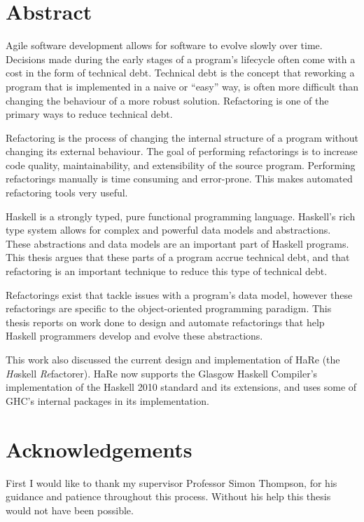 \begin{preface}
\section{Abstract}

Agile software development allows for software to evolve slowly over time. Decisions made during the early stages of a program's lifecycle often come with a cost in the form of technical debt. Technical debt is the concept that reworking a program that is implemented in a naive or ``easy'' way, is often more difficult than changing the behaviour of a more robust solution. Refactoring is one of the primary ways to reduce technical debt.

Refactoring is the process of changing the internal structure of a program without changing its external behaviour. The goal of performing refactorings is to increase code quality, maintainability, and extensibility of the source program. Performing refactorings manually is time consuming and error-prone. This makes automated refactoring tools very useful.

Haskell is a strongly typed, pure functional programming language. Haskell's rich type system allows for complex and powerful data models and abstractions. These abstractions and data models are an important part of Haskell programs. This thesis argues that these parts of a program accrue technical debt, and that refactoring is an important technique to reduce this type of technical debt.

Refactorings exist that tackle issues with a program's data model, however these refactorings are specific to the object-oriented programming paradigm. This thesis reports on work done to design and automate refactorings that help Haskell programmers develop and evolve these abstractions.

This work also discussed the current design and implementation of HaRe (the \textit{Ha}skell \textit{Re}factorer). HaRe now supports the Glasgow Haskell Compiler's implementation of the Haskell 2010 standard and its extensions, and uses some of GHC's internal packages in its implementation. 

\section{Acknowledgements}
First I would like to thank my supervisor Professor Simon Thompson, for his guidance and patience throughout this process. Without his help this thesis would not have been possible.


\end{preface}
